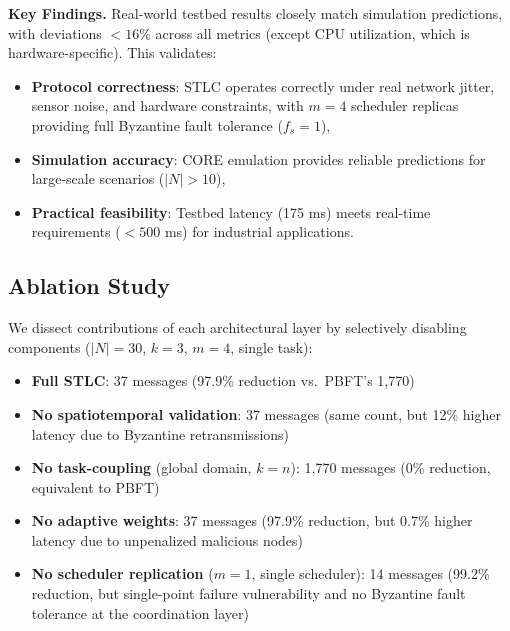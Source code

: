 \documentclass[manuscript,screen,review]{acmart}
\begin{document}
\begin{table}[h]
\centering
\caption{Testbed vs.\ Simulation: Summary of Key Metrics ($m=4$)}
\label{tab:testbed_summary}
\small
{}
\end{table}

\textbf{Key Findings.} Real-world testbed results closely match simulation predictions, with deviations $< 16\%$ across all metrics (except CPU utilization, which is hardware-specific). This validates:
\begin{itemize}
    \item \textbf{Protocol correctness}: STLC operates correctly under real network jitter, sensor noise, and hardware constraints, with $m = 4$ scheduler replicas providing full Byzantine fault tolerance ($f_s = 1$),
    \item \textbf{Simulation accuracy}: CORE emulation provides reliable predictions for large-scale scenarios ($|N| > 10$),
    \item \textbf{Practical feasibility}: Testbed latency (175 ms) meets real-time requirements ($< 500$ ms) for industrial applications.
\end{itemize}

\subsection{Ablation Study}
\label{sec:ablation}

We dissect contributions of each architectural layer by selectively disabling components ($|N|=30$, $k=3$, $m=4$, single task):

\begin{itemize}
    \item \textbf{Full STLC}: 37 messages (97.9\% reduction vs.\ PBFT's 1,770)
    \item \textbf{No spatiotemporal validation}: 37 messages (same count, but 12\% higher latency due to Byzantine retransmissions)
    \item \textbf{No task-coupling} (global domain, $k=n$): 1,770 messages (0\% reduction, equivalent to PBFT)
    \item \textbf{No adaptive weights}: 37 messages (97.9\% reduction, but 0.7\% higher latency due to unpenalized malicious nodes)
    \item \textbf{No scheduler replication} ($m=1$, single scheduler): 14 messages (99.2\% reduction, but single-point failure vulnerability and no Byzantine fault tolerance at the coordination layer)
\end{itemize}
\end{document}

